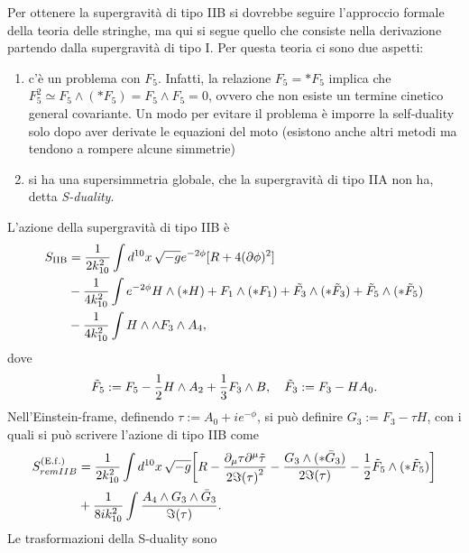 Per ottenere la supergravità di tipo IIB si dovrebbe seguire l'approccio formale della teoria delle stringhe, ma qui si segue quello che consiste nella derivazione partendo dalla supergravità di tipo I. Per questa teoria ci sono due aspetti:
\begin{enumerate}
    \item c'è un problema con $F_5$. Infatti, la relazione $F_5 = *F_5$ implica che $F_5^2 \simeq F_5 \wedge (*F_5) = F_5 \wedge F_5 = 0$, ovvero che non esiste un termine cinetico general covariante. Un modo per evitare il problema è imporre la self-duality solo dopo aver derivate le equazioni del moto (esistono anche altri metodi ma tendono a rompere alcune simmetrie)
    \item si ha una supersimmetria globale, che la supergravità di tipo IIA non ha, detta \emph{S-duality}.
\end{enumerate}
L'azione della supergravità di tipo IIB è 
\begin{equation}
    \begin{split}
        S_{\mathrm{IIB}} &= \frac{1}{2k_{10}^2}\int d^{10}x\,\sqrt{-g}e^{-2\phi}[R + 4(\partial\phi)^2] \\
        &-\frac{1}{4k_{10}^2}\int e^{-2\phi} H \wedge (*H) + F_1 \wedge (*F_1) + \tilde{F_3} \wedge (*\tilde{F}_3) + \tilde{F}_5 \wedge (*\tilde{F}_5) \\
        &-\frac{1}{4k_{10}^2}\int H \wedge \wedge F_3 \wedge A_4,
    \end{split}
\end{equation}
dove 
\begin{equation}
    \tilde{F}_5 := F_5 - \frac{1}{2}H \wedge A_2 + \frac{1}{3}F_3 \wedge B,\quad \tilde{F}_3 := F_3 - HA_0.
\end{equation}
Nell'Einstein-frame, definendo $\tau := A_0 + ie^{-\phi}$, si può definire $G_3 := F_3 - \tau H$, con i quali si può scrivere l'azione di tipo IIB come 
\begin{equation}
    \begin{split}
        S_{rem{IIB}}^{(\mathrm{E.f.})} &= \frac{1}{2k_{10}^2}\int d^{10}x\,\sqrt{-g}\bigg[R - \frac{\partial_\mu\tau\partial^\mu\tilde{\tau}}{2\Im{(\tau)}^2} - \frac{G_3 \wedge (*\bar{G}_3)}{2\Im{(\tau)}} - \frac{1}{2}\tilde{F}_5 \wedge (*\tilde{F}_5)\bigg] \\
        &+\frac{1}{8ik_{10}^2}\int \frac{A_4 \wedge G_3 \wedge \bar{G}_3}{\Im{(\tau)}}.
    \end{split}
\end{equation}
Le trasformazioni della S-duality sono 
